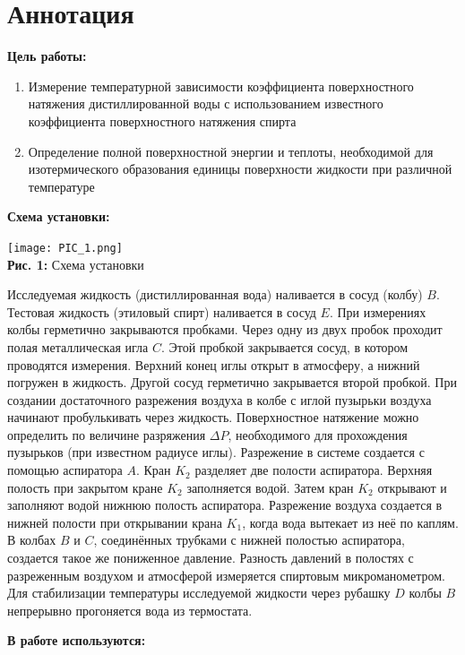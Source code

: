 \documentclass[12pt,a4paper]{scrartcl}
\begin{document}
	\section{Аннотация}
	
	\textbf{Цель работы: }
	
	\begin{enumerate}
		\item Измерение температурной зависимости коэффициента поверхностного натяжения дистиллированной воды с использованием известного коэффициента поверхностного натяжения спирта
		\item Определение полной поверхностной энергии  и теплоты, необходимой для изотермического образования единицы  поверхности жидкости  при различной температуре
	\end{enumerate}
	
	\textbf{Схема установки:}
	\begin{center}
		\texttt{[image: PIC\_1.png]}
		\\\textbf{Рис. 1:} Схема установки
	\end{center}
		
	Исследуемая жидкость (дистиллированная вода) наливается в сосуд (колбу) $B$. Тестовая жидкость (этиловый спирт) наливается в сосуд $E$. При измерениях колбы герметично закрываются пробками. Через одну из двух пробок проходит полая металлическая игла $C$. Этой пробкой закрывается сосуд, в котором проводятся измерения. Верхний конец иглы открыт в атмосферу, а нижний погружен в жидкость. Другой сосуд герметично закрывается второй пробкой. При создании достаточного разрежения воздуха в колбе с иглой пузырьки воздуха начинают пробулькивать через жидкость. Поверхностное натяжение можно определить по величине разряжения $\Delta P$, необходимого для прохождения пузырьков (при известном радиусе иглы). Разрежение в системе создается с помощью аспиратора $A$. Кран $K_2$ разделяет две полости аспиратора. Верхняя полость при закрытом кране $K_2$ заполняется водой. Затем кран $K_2$ открывают и заполняют водой нижнюю полость  аспиратора. Разрежение воздуха создается в нижней полости при открывании крана $K_1$, когда вода вытекает из неё по каплям. В колбах $B$ и $C$, соединённых трубками с нижней полостью аспиратора, создается такое же пониженное давление. Разность давлений в полостях с разреженным воздухом и атмосферой измеряется спиртовым микроманометром. Для стабилизации температуры исследуемой жидкости через рубашку $D$ колбы $B$ непрерывно прогоняется вода из термостата.	
		
	\textbf{В работе используются:}
	
\end{document}
